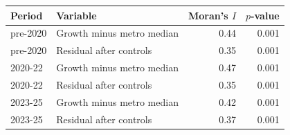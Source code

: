 \footnotesize\setlength{\tabcolsep}{4pt}
\begin{tabular}{llrr}
\toprule
Period & Variable & Moran's $I$ & $p$-value \\
\midrule
pre-2020 & Growth minus metro median & 0.44 & 0.001 \\
pre-2020 & Residual after controls & 0.35 & 0.001 \\
2020-22 & Growth minus metro median & 0.47 & 0.001 \\
2020-22 & Residual after controls & 0.35 & 0.001 \\
2023-25 & Growth minus metro median & 0.42 & 0.001 \\
2023-25 & Residual after controls & 0.37 & 0.001 \\
\bottomrule
\end{tabular}
